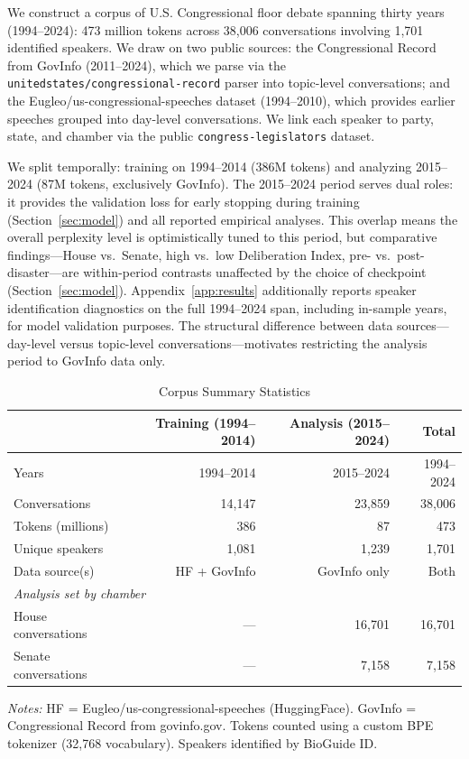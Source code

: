 \documentclass[12pt]{article}
\begin{document}
We construct a corpus of U.S. Congressional floor debate spanning thirty years (1994--2024): 473 million tokens across 38,006 conversations involving 1,701 identified speakers. We draw on two public sources: the Congressional Record from GovInfo \citep{govinfo} (2011--2024), which we parse via the \texttt{unitedstates/\allowbreak{}congressional-record} parser \citep{unitedstates_parser} into topic-level conversations; and the Eugleo/\allowbreak{}us-congressional-speeches dataset \citep{eugleo2023} (1994--2010), which provides earlier speeches grouped into day-level conversations. We link each speaker to party, state, and chamber via the public \texttt{congress-legislators} dataset.

We split temporally: training on 1994--2014 (386M tokens) and analyzing 2015--2024 (87M tokens, exclusively GovInfo). The 2015--2024 period serves dual roles: it provides the validation loss for early stopping during training (Section~\ref{sec:model}) and all reported empirical analyses. This overlap means the overall perplexity level is optimistically tuned to this period, but comparative findings---House vs.\ Senate, high vs.\ low Deliberation Index, pre- vs.\ post-disaster---are within-period contrasts unaffected by the choice of checkpoint (Section~\ref{sec:model}). Appendix~\ref{app:results} additionally reports speaker identification diagnostics on the full 1994--2024 span, including in-sample years, for model validation purposes. The structural difference between data sources---day-level versus topic-level conversations---motivates restricting the analysis period to GovInfo data only.

\begin{table}[H]
\centering
\caption{Corpus Summary Statistics}
\label{tab:corpus}
\begin{threeparttable}
\begin{tabular}{lrrr}
\toprule
& Training (1994--2014) & Analysis (2015--2024) & Total \\
\midrule
Years & 1994--2014 & 2015--2024 & 1994--2024 \\
Conversations & 14,147 & 23,859 & 38,006 \\
Tokens (millions) & 386 & 87 & 473 \\
Unique speakers & 1,081 & 1,239 & 1,701 \\
Data source(s) & HF + GovInfo & GovInfo only & Both \\
\midrule
\multicolumn{4}{l}{\textit{Analysis set by chamber}} \\
\quad House conversations & --- & 16,701 & 16,701 \\
\quad Senate conversations & --- & 7,158 & 7,158 \\
\bottomrule
\end{tabular}
\begin{tablenotes}[flushleft]
\small
\item \textit{Notes:} HF = Eugleo/us-congressional-speeches (HuggingFace). GovInfo = Congressional Record from govinfo.gov. Tokens counted using a custom BPE tokenizer (32,768 vocabulary). Speakers identified by BioGuide ID.
\end{tablenotes}
\end{threeparttable}
\end{table}
\end{document}
